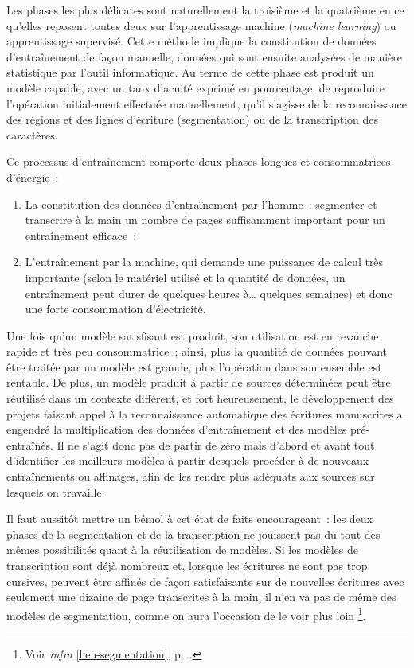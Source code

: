 \documentclass[a4paper,12pt,twoside]{book}
\begin{document}
		Les phases les plus délicates sont naturellement la troisième et la quatrième en ce qu'elles reposent toutes deux sur l'apprentissage machine (\textit{machine learning}) ou apprentissage supervisé. Cette méthode implique la constitution de données d'entraînement de façon manuelle, données qui sont ensuite analysées de manière statistique par l'outil informatique. Au terme de cette phase est produit un modèle capable, avec un taux d'acuité exprimé en pourcentage, de reproduire l'opération initialement effectuée manuellement, qu'il s'agisse de la reconnaissance des régions et des lignes d'écriture (\gls{segmentation}) ou de la transcription des caractères.
		
		Ce processus d'entraînement comporte deux phases longues et consommatrices d'énergie~:
		
		\begin{enumerate}
			\item La constitution des données d'entraînement par l'homme~: segmenter et transcrire à la main un nombre de pages suffisamment important pour un entraînement efficace~;
			\item L'entraînement par la machine, qui demande une puissance de calcul très importante (selon le matériel utilisé et la quantité de données, un entraînement peut durer de quelques heures à… quelques semaines) et donc une forte consommation d'électricité.
		\end{enumerate}
		
		Une fois qu'un modèle satisfisant est produit, son utilisation est en revanche rapide et très peu consommatrice~; ainsi, plus la quantité de données pouvant être traitée par un modèle est grande, plus l'opération dans son ensemble est rentable. De plus, un modèle produit à partir de sources déterminées peut être réutilisé dans un contexte différent, et fort heureusement, le développement des projets faisant appel à la reconnaissance automatique des écritures manuscrites a engendré la multiplication des données d'entraînement et des modèles pré-entraînés. Il ne s'agit donc pas de partir de zéro mais d'abord et avant tout d'identifier les meilleurs modèles à partir desquels procéder à de nouveaux entraînements ou affinages, afin de les rendre plus adéquats aux sources sur lesquels on travaille.
		
		Il faut aussitôt mettre un bémol à cet état de faits encourageant~: les deux phases de la \gls{segmentation} et de la transcription ne jouissent pas du tout des mêmes possibilités quant à la réutilisation de modèles. Si les modèles de transcription sont déjà nombreux et, lorsque les écritures ne sont pas trop cursives, peuvent être affinés de façon satisfaisante sur de nouvelles écritures avec seulement une dizaine de page transcrites à la main, il n'en va pas de même des modèles de \gls{segmentation}, comme on aura l'occasion de le voir plus loin
		\footnote{Voir \textit{infra} \ref{lieu-segmentation}, p.~\pageref{lieu-segmentation}.}.
		
\end{document}

